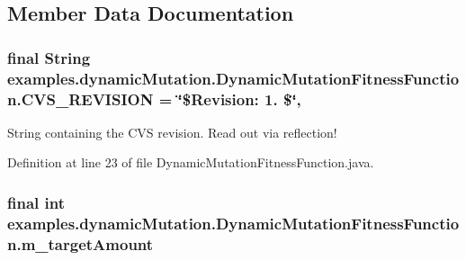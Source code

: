 \subsection{Member Data Documentation}
\hypertarget{classexamples_1_1dynamic_mutation_1_1_dynamic_mutation_fitness_function_abc4a30325576d54405f21c77ab116255}{
\subsubsection[{C\-V\-S\-\_\-\-R\-E\-V\-I\-S\-I\-O\-N}]{\setlength{\rightskip}{0pt plus 5cm}final String examples.\-dynamic\-Mutation.\-Dynamic\-Mutation\-Fitness\-Function.\-C\-V\-S\-\_\-\-R\-E\-V\-I\-S\-I\-O\-N = \char`\"{}\$Revision\-: 1. \$\char`\"{}\hspace{0.3cm}{\ttfamily [static]}, {\ttfamily [private]}}}\label{classexamples_1_1dynamic_mutation_1_1_dynamic_mutation_fitness_function_abc4a30325576d54405f21c77ab116255}
String containing the C\-V\-S revision. Read out via reflection! 

Definition at line 23 of file Dynamic\-Mutation\-Fitness\-Function.\-java.

\hypertarget{classexamples_1_1dynamic_mutation_1_1_dynamic_mutation_fitness_function_a05ef132b9ca65992cf44b3ccb9eb5076}{
\subsubsection[{m\-\_\-target\-Amount}]{\setlength{\rightskip}{0pt plus 5cm}final int examples.\-dynamic\-Mutation.\-Dynamic\-Mutation\-Fitness\-Function.\-m\-\_\-target\-Amount\hspace{0.3cm}{\ttfamily [private]}}}\label{classexamples_1_1dynamic_mutation_1_1_dynamic_mutation_fitness_function_a05ef132b9ca65992cf44b3ccb9eb5076}


